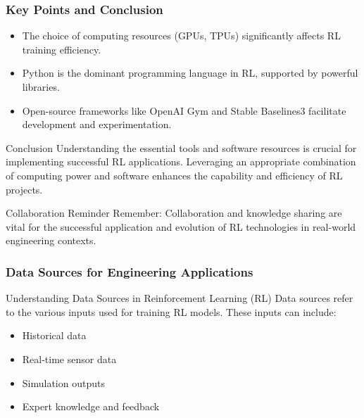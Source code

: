 \documentclass[aspectratio=169]{beamer}
\begin{document}
\begin{frame}[fragile]
    \frametitle{Key Points and Conclusion}
    \begin{itemize}
        \item The choice of computing resources (GPUs, TPUs) significantly affects RL training efficiency.
        \item Python is the dominant programming language in RL, supported by powerful libraries.
        \item Open-source frameworks like OpenAI Gym and Stable Baselines3 facilitate development and experimentation.
    \end{itemize}
    
    \begin{block}{Conclusion}
        Understanding the essential tools and software resources is crucial for implementing successful RL applications. Leveraging an appropriate combination of computing power and software enhances the capability and efficiency of RL projects.
    \end{block}

    \begin{block}{Collaboration Reminder}
        Remember: Collaboration and knowledge sharing are vital for the successful application and evolution of RL technologies in real-world engineering contexts.
    \end{block}
\end{frame}

\begin{frame}[fragile]
    \frametitle{Data Sources for Engineering Applications}
    \begin{block}{Understanding Data Sources in Reinforcement Learning (RL)}
        Data sources refer to the various inputs used for training RL models. These inputs can include:
        \begin{itemize}
            \item Historical data
            \item Real-time sensor data
            \item Simulation outputs
            \item Expert knowledge and feedback
        \end{itemize}
    \end{block}
\end{frame}
\end{document}
